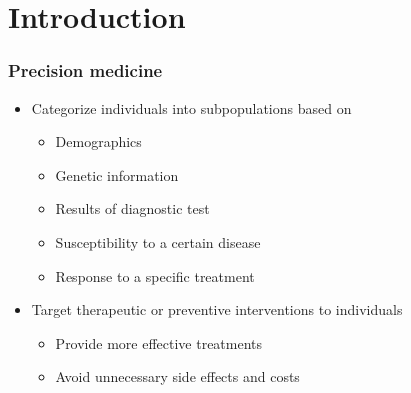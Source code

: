\documentclass[unknownkeysallowed]{beamer}
\title[Optimal Treatment Regimes under Constraints] %
\subtitle{Ph.D. Thesis Presentation} %
\author[Shuping Ruan] %
{Shuping~Ruan}
\institute[NCSU]
{
  Supervised by Dr. Eric Laber \\
  Department of Statistics\\%
  North Carolina State University
}
\begin{document}
\begin{frame}
  \titlepage
\end{frame}

\section*{Introduction}
\begin{frame}
  \frametitle{Precision medicine}
  \begin{itemize}
  	\item Categorize individuals into subpopulations based on
  	\begin{itemize}
  	\item Demographics
  	\item Genetic information
  	\item Results of diagnostic test
  	\item Susceptibility to a certain disease
  	\item Response to a specific treatment
  	\end{itemize}
  \item Target therapeutic or preventive interventions to individuals
 	\begin{itemize}
 	\item Provide more effective treatments
 	\item Avoid unnecessary side effects and costs
 	\end{itemize}
  \end{itemize}
\end{frame}
\end{document}
